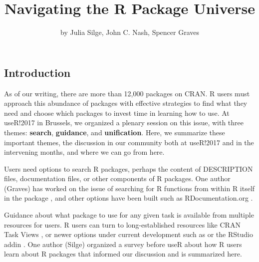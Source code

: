 \title{Navigating the R Package Universe}
\author{by Julia Silge, John C. Nash, Spencer Graves}

\maketitle



\hypertarget{introduction}{%
\subsection{Introduction}\label{introduction}}

As of our writing, there are more than 12,000 packages on CRAN. R users
must approach this abundance of packages with effective strategies to
find what they need and choose which packages to invest time in learning
how to use. At useR!2017 in Brussels, we organized a plenary session on
this issue, with three themes: \textbf{search}, \textbf{guidance}, and
\textbf{unification}. Here, we summarize these important themes, the
discussion in our community both at useR!2017 and in the intervening
months, and where we can go from here.

Users need options to search R packages, perhaps the content of
DESCRIPTION files, documentation files, or other components of R
packages. One author (Graves) has worked on the issue of searching for R
functions from within R itself in the  package \citep{sos},
and other options have been built such as RDocumentation.org
\citep{rdocumentation}.

Guidance about what package to use for any given task is available from
multiple resources for users. R users can turn to long-established
resources like CRAN Task Views \citep{ctvs}, or newer options under
current development such as  \citep{packagemetrics}
or the  RStudio addin \citep{cransearcher}. One
author (Silge) organized a survey before useR about how R users learn
about R packages that informed our discussion and is summarized here.

